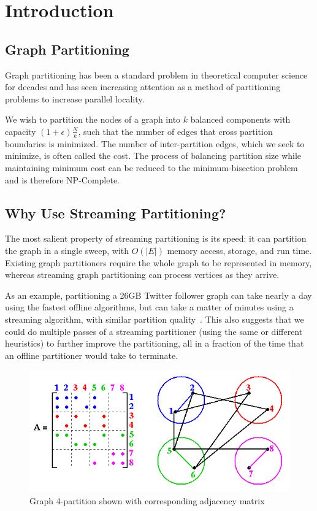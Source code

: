 \section{Introduction}
\subsection{Graph Partitioning}
Graph partitioning has been a standard problem in theoretical computer science for decades and has seen increasing attention as a method of partitioning problems to increase parallel locality. 


We wish to partition the nodes of a graph into $k$ balanced components with capacity $(1+\epsilon)\frac{N}{k}$, such that the number of edges that cross partition boundaries is minimized.
The number of inter-partition edges, which we seek to minimize, is often called the cost.
The process of balancing partition size while maintaining minimum cost can be reduced to the minimum-bisection problem~\cite{Garey:1979:CIG:578533} and is therefore NP-Complete.

\subsection{Why Use Streaming Partitioning?}
The most salient property of streaming partitioning is its speed: it can partition the graph in a single sweep, with $O(|E|)$ memory access, storage, and run time.
Existing graph partitioners require the whole graph to be represented in memory, whereas streaming graph partitioning can process vertices as they arrive.

As an example, partitioning a 26GB Twitter follower graph can take nearly a day using the fastest offline algorithms, but can take a matter of minutes using a streaming algorithm, with similar partition quality~\cite{tsourakakis2012fennel}.
This also suggests that we could do multiple passes of a streaming partitioner (using the same or different heuristics) to further improve the partitioning, all in a fraction of the time that an offline partitioner would take to terminate. 


\begin{figure}[h]
\centering
\includegraphics[width=0.8\columnwidth] {figures/graphpart.png}
\caption[Caption for]{Graph 4-partition shown with corresponding adjacency matrix \footnotemark}
\label{fig:0}
\end{figure}

